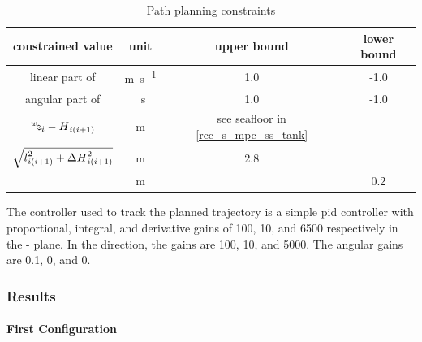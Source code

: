 \begin{table}
	\centering
	\robustify\bfseries
	\caption{Path planning constraints}
	\begin{tabular}{@{}ccSS@{}}
		constrained value                                                        & unit            & {upper bound}                              & {lower bound} \\ \midrule
		linear part of                                            & \unit{\m\per\s} & 1.0                                        & -1.0          \\
		angular part of                                           & \unit{\per\s}   & 1.0                                        & -1.0          \\
		$\ldcoord{z}{w}{i} - \ldscal{\catH{}}{i(i+1)}$                           & \unit{\m}       & {see seafloor in \cref{rcc_s_mpc_ss_tank}} &               \\
		$\sqrt{{l{}}^{2}_{i(i+1)} + \Delta{\ensuremath{H}{}}^{2}_{i(i+1)}}$ & \unit{\m}       & 2.8                                        &               \\
		                                                 & \unit{\m}       &                                            & 0.2           \\
	\end{tabular}
	\label{rcc_s_pp_i_constrains_values}
\end{table}

The controller used to track the planned trajectory is a simple \ac{pid} controller with
proportional, integral, and derivative gains of \num{100}, \num{10}, and \num{6500} respectively in
the - plane. In the  direction, the gains are \num{100}, \num{10}, and
\num{5000}. The angular gains are \num{0.1}, \num{0}, and \num{0}.

\subsubsection{Results}
\label{rcc_s_pp_results}

\paragraph{First Configuration}
\label{rcc_s_pp_r_first_configuration}

